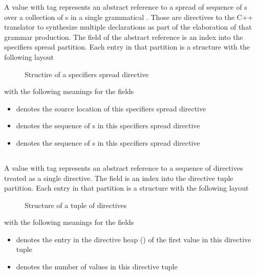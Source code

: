 A  value with tag  represents an abstract reference to a spread of sequence of s 
over a collection of s in a single grammatical . 
Those are directives to the C++ translator to synthesize multiple declarations as part of the elaboration of that grammar production.
The  field of the abstract reference is an index into the specifiers spread partition.
Each entry in that partition is a structure with the following layout
%
\begin{figure}[H]
    \centering
    \caption{Structire of a specifiers spread directive}
    \label{fig:ifc:DirSort:SpecifiersSpread}
\end{figure}
%
with the following meanings for the fields
\begin{itemize}
    \item {} denotes the source location of this specifiers spread directive
    \item {} denotes the sequence of s in this specifiers spread directive
    \item {} denotes the sequence of s in this specifiers spread directive
\end{itemize}




\subsection{}
\label{sec:ifc:DirSort:Tuple}

A  value with tag  represents an abstract reference to a sequence of directives treated as a single directive.
The  field is an index into the directive tuple partition.
Each entry in that partition is a structure with the following layout
%
\begin{figure}[H]
    \centering
    \caption{Structure of a tuple of directives}
    \label{fig:ifc:DirSort:Tuple}
\end{figure}
%
with the following meanings for the fields
\begin{itemize}
    \item {} denotes the entry in the directive heap () of the first  value in this directive tuple
    \item {} denotes the number of  values in this directive tuple 
\end{itemize}

